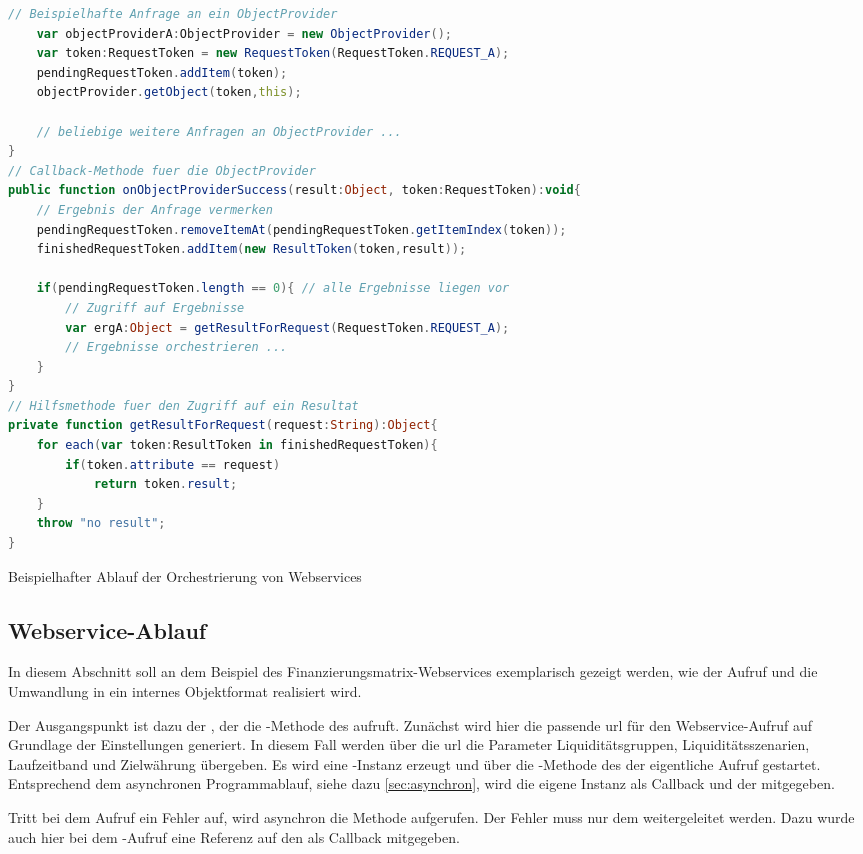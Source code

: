 \begin{onehalfspacing}
\begin{programm}[ht]
\begin{lstlisting}[language=ActionScript]
	// Beispielhafte Anfrage an ein ObjectProvider
	var objectProviderA:ObjectProvider = new ObjectProvider();
	var token:RequestToken = new RequestToken(RequestToken.REQUEST_A);
	pendingRequestToken.addItem(token);
	objectProvider.getObject(token,this);
	
	// beliebige weitere Anfragen an ObjectProvider ...
}
// Callback-Methode fuer die ObjectProvider
public function onObjectProviderSuccess(result:Object, token:RequestToken):void{
	// Ergebnis der Anfrage vermerken
	pendingRequestToken.removeItemAt(pendingRequestToken.getItemIndex(token));
	finishedRequestToken.addItem(new ResultToken(token,result));
	
	if(pendingRequestToken.length == 0){ // alle Ergebnisse liegen vor
		// Zugriff auf Ergebnisse
		var ergA:Object = getResultForRequest(RequestToken.REQUEST_A);
		// Ergebnisse orchestrieren ...
	}
}
// Hilfsmethode fuer den Zugriff auf ein Resultat	
private function getResultForRequest(request:String):Object{
	for each(var token:ResultToken in finishedRequestToken){
		if(token.attribute == request)
			return token.result;
	}
	throw "no result";
}
\end{lstlisting}
\caption{Beispielhafter Ablauf der Orchestrierung von Webservices\label{listing:orchestrierung:webservices}}
\end{programm}


\subsection{Webservice-Ablauf}
In diesem Abschnitt soll an dem Beispiel des Finanzierungsmatrix-Webservices exemplarisch gezeigt werden, wie der Aufruf und die Umwandlung in ein internes Objektformat realisiert wird.

Der Ausgangspunkt ist dazu der , der die -Methode des  aufruft. Zunächst wird hier die passende \gls{url} für den Webservice-Aufruf auf Grundlage der Einstellungen generiert. In diesem Fall werden über die \gls{url} die Parameter Liquiditätsgruppen, Liquiditätsszenarien, Laufzeitband und Zielwährung übergeben. Es wird eine -Instanz erzeugt und über die -Methode des  der eigentliche Aufruf gestartet. Entsprechend dem asynchronen Programmablauf, siehe dazu \vref{sec:asynchron}, wird die eigene Instanz als Callback und der  mitgegeben.

Tritt bei dem Aufruf ein Fehler auf, wird asynchron die Methode  aufgerufen. Der Fehler muss nur dem  weitergeleitet werden. Dazu wurde auch hier bei dem -Aufruf eine Referenz auf den  als Callback mitgegeben.


\end{onehalfspacing}
